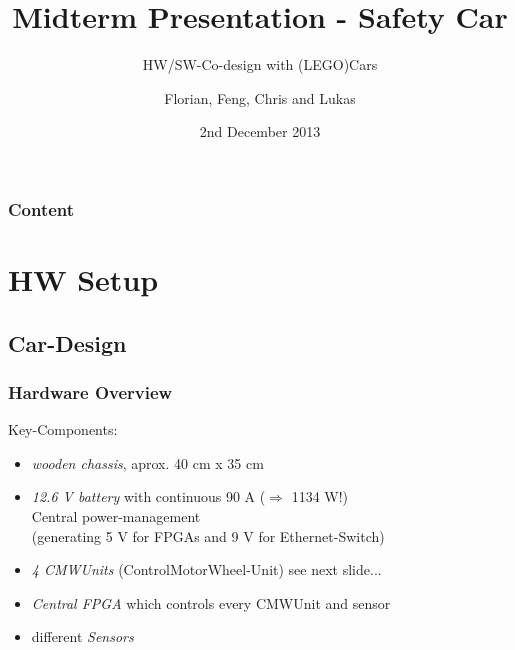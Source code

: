 \documentclass{beamer}
\title{Midterm Presentation - Safety Car}
\subtitle{HW/SW-Co-design with (LEGO)Cars}
\author{Florian, Feng, Chris and Lukas}
\institute[TUM]{Technische Universität München}
\date{2nd December 2013}
\begin{document}
\begin{frame}
	\titlepage
\end{frame}

\begin{frame}
	\frametitle{Content}
	\tableofcontents
\end{frame}

\section{HW Setup}

\subsection{Car-Design}

\begin{frame}
	\frametitle{Hardware Overview}
	Key-Components:
	\begin{itemize}
		\item \textit{wooden chassis}, aprox. 40 cm x 35 cm
		
		\item \textit{12.6 V battery} with continuous 90 A ($\Rightarrow$ 1134 W!)\\
		Central power-management\\
		(generating 5 V for FPGAs and 9 V for Ethernet-Switch)	
	
		\item \textit{4 CMWUnits} (ControlMotorWheel-Unit) see next slide...
		
		\item \textit{Central FPGA} which controls every CMWUnit and sensor
		
		\item different \textit{Sensors}
	\end{itemize}
\end{frame}
\end{document}
